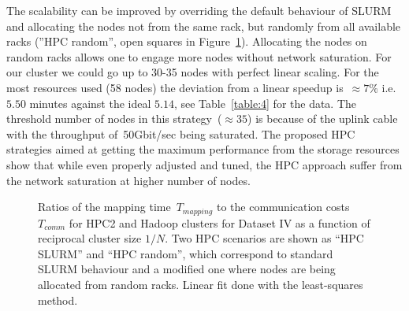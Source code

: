 \documentclass[11pt, oneside]{article}   	%
\begin{document}
The scalability can be improved by overriding the default behaviour of SLURM and allocating the nodes not from the same rack, but randomly from all available racks (''HPC random'', open squares in Figure~\ref{fig:fig3}). Allocating the nodes on random racks allows one to engage more nodes without network saturation. For our cluster we could go up to 30-35 nodes with perfect linear scaling. For the most resources used (58 nodes) the deviation from a linear speedup is~$\approx 7\%$ i.e. $5.50$ minutes against the ideal $5.14$, see Table~\ref{table:4}  for the data. The threshold number of nodes in this strategy~($\approx35$) is because of the uplink cable with the throughput of~50Gbit/sec being saturated. 
The proposed HPC strategies aimed at getting the maximum performance from the storage resources show that while even properly adjusted and tuned, the HPC approach suffer from the network saturation at higher number of nodes.


\begin{figure}
	\small
	
	\normalsize
	\caption{Ratios of the mapping time~$T_{mapping}$ to the communication costs~$T_{comm}$ for HPC2 and Hadoop clusters for Dataset IV as a function of reciprocal cluster size $1/N$. Two HPC scenarios are shown as ``HPC SLURM'' and ``HPC random'', which correspond to standard SLURM behaviour and a modified one where nodes are being allocated from random racks.
Linear fit  done with the least-squares method.}
	\label{fig:fig3}
\end{figure}
\end{document}
